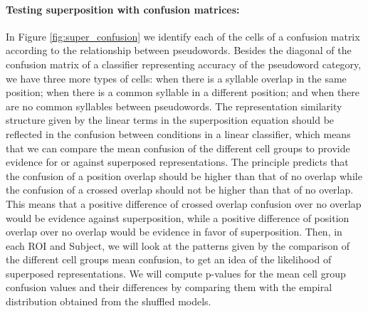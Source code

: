 \paragraph{Testing superposition with confusion matrices:}
In Figure \ref{fig:super_confusion} we identify each of the cells of a confusion matrix according to the relationship between pseudowords.
Besides the diagonal of the confusion matrix of a classifier representing accuracy of the pseudoword category, we have three more types of cells: when there is a syllable overlap in the same position; when there is a common syllable in a different position; and when there are no common syllables between pseudowords.
The representation similarity structure given by the linear terms in the superposition equation should be reflected in the confusion between conditions in a linear classifier, which means that we can compare the mean confusion of the different cell groups to provide evidence for or against superposed representations.
The principle predicts that the confusion of a position overlap should be higher than that of no overlap while the confusion of a crossed overlap should not be higher than that of no overlap.
This means that a positive difference of crossed overlap confusion over no overlap would be evidence against superposition, while a positive difference of position overlap over no overlap would be evidence in favor of superposition.
Then, in each ROI and Subject, we will look at the patterns given by the comparison of the different cell groups mean confusion, to get an idea of the likelihood of superposed representations.
We will compute p-values for the mean cell group confusion values and their differences by comparing them with the empiral distribution obtained from the shuffled models.


